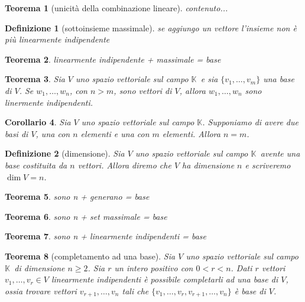 \documentclass[9pt, a4paper]{article}
\newcommand{\K}{\mathbb{K}}
\newcommand{\letvs}{Sia $ V $ uno spazio vettoriale sul campo $ \K $}
\theoremstyle{mythm}
\newtheorem{definition}{Definizione}[section]
\newtheorem{thm}{Teorema}[section]
\newtheorem{corollary}[thm]{Corollario}
\begin{document}
\begin{thm}[unicità della combinazione lineare]
	contenuto...
\end{thm}

\begin{definition}[sottoinsieme massimale]
	\textsf{se aggiungo un vettore l'insieme non è più linearmente indipendente}	
\end{definition}

\begin{thm}
	\textsf{linearmente indipendente + massimale = base}
\end{thm}

\begin{thm}
	\letvs \ e sia $ \{v_1, \ldots, v_m\} $ una base di $ V $. Se $ w_1, \ldots, w_n $, con $ n > m $, sono vettori di $ V $, allora $ w_1, \ldots, w_n $ sono linermente indipendenti.
\end{thm}

\begin{corollary}
	\letvs. Supponiamo di avere due basi di $ V $, una con $ n $ elementi e una con $ m $ elementi. Allora $ n = m $.
\end{corollary}

\begin{definition}[dimensione]
	\letvs \, avente una base costituita da $ n $ vettori. Allora diremo che $ V $ ha dimensione $ n $ e scriveremo $ \dim V = n $.
\end{definition}

\begin{thm}
	\textsf{sono n + generano = base}
\end{thm}

\begin{thm}
	\textsf{sono n + set massimale = base}
\end{thm}

\begin{thm}
	\textsf{sono n + linearmente indipendenti = base}
\end{thm}

\begin{thm}[completamento ad una base]
	\letvs \, di dimensione $ n \geq 2 $. Sia $ r $ un intero positivo con $ 0 < r < n $. Dati $ r $ vettori $ v_1, \ldots , v_r \in V $ linearmente indipendenti è possibile completarli ad una base di $ V $, ossia trovare vettori $ v_{r+1}, \ldots, v_n $ tali che $ \{v_1, \ldots , v_r, v_{r+1}, \ldots , v_n\} $ è base di $ V $.
\end{thm}

\clearpage
\end{document}
